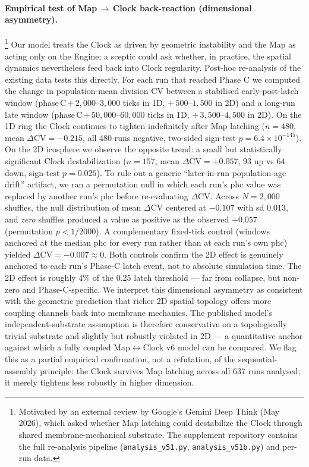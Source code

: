\documentclass[11pt,letterpaper]{article}
\begin{document}
\paragraph{Empirical test of Map\,$\to$\,Clock back-reaction (dimensional asymmetry).}\footnote{Motivated by an external review by Google's Gemini Deep Think (May 2026), which asked whether Map latching could destabilize the Clock through shared membrane-mechanical substrate. The supplement repository contains the full re-analysis pipeline (\texttt{analysis\_v51.py}, \texttt{analysis\_v51b.py}) and per-run data.} Our model treats the Clock as driven by geometric instability and the Map as acting only on the Engine; a sceptic could ask whether, in practice, the spatial dynamics nevertheless feed back into Clock regularity. Post-hoc re-analysis of the existing data tests this directly. For each run that reached Phase C we computed the change in population-mean division CV between a stabilised early-post-latch window (phase\,C\,$+\,2{,}000$–$3{,}000$ ticks in 1D, $+\,500$–$1{,}500$ in 2D) and a long-run late window (phase\,C\,$+\,50{,}000$–$60{,}000$ ticks in 1D, $+\,3{,}500$–$4{,}500$ in 2D). On the 1D ring the Clock continues to tighten indefinitely after Map latching ($n = 480$, mean $\Delta\mathrm{CV} = -0.215$, all 480 runs negative, two-sided sign-test $p = 6.4 \times 10^{-145}$). On the 2D icosphere we observe the opposite trend: a small but statistically significant Clock destabilization ($n = 157$, mean $\Delta\mathrm{CV} = +0.057$, 93 up vs 64 down, sign-test $p = 0.025$). To rule out a generic ``later-in-run population-age drift'' artifact, we ran a permutation null in which each run's $\mathrm{phc}$ value was replaced by another run's $\mathrm{phc}$ before re-evaluating $\Delta\mathrm{CV}$. Across $N = 2{,}000$ shuffles, the null distribution of mean $\Delta\mathrm{CV}$ centered at $-0.107$ with sd $0.013$, and \emph{zero} shuffles produced a value as positive as the observed $+0.057$ (permutation $p < 1/2000$). A complementary fixed-tick control (windows anchored at the median $\mathrm{phc}$ for every run rather than at each run's own $\mathrm{phc}$) yielded $\Delta\mathrm{CV} = -0.007 \approx 0$. Both controls confirm the 2D effect is genuinely anchored to each run's Phase-C latch event, not to absolute simulation time. The 2D effect is roughly 4\% of the 0.25 latch threshold --- far from collapse, but non-zero and Phase-C-specific. We interpret this dimensional asymmetry as consistent with the geometric prediction that richer 2D spatial topology offers more coupling channels back into membrane mechanics. The published model's independent-substrate assumption is therefore conservative on a topologically trivial substrate and slightly but robustly violated in 2D --- a quantitative anchor against which a fully coupled Map$\leftrightarrow$Clock v6 model can be compared. We flag this as a partial empirical confirmation, not a refutation, of the sequential-assembly principle: the Clock survives Map latching across all 637 runs analysed; it merely tightens less robustly in higher dimension.
\end{document}
